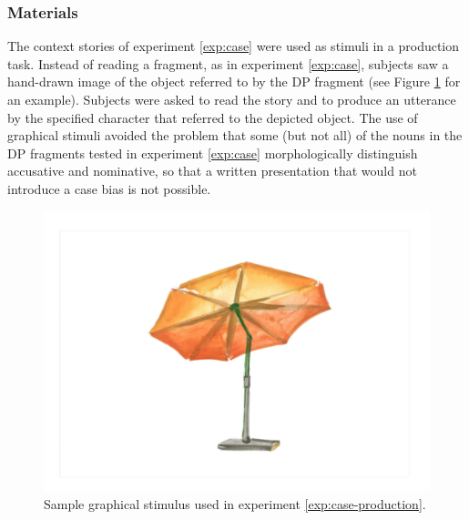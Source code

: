 \subsubsection{Materials}
The context stories of experiment \ref{exp:case} were used as stimuli in a production task. Instead of reading a fragment, as in experiment \ref{exp:case}, subjects saw a hand-drawn image of the object referred to by the DP fragment (see Figure \ref{fig:production-stim} for an example). Subjects were asked to read the story and to produce an utterance by the specified character that referred to the depicted object. The use of graphical stimuli avoided the problem that some (but not all) of the nouns in the DP fragments tested in experiment \ref{exp:case} morphologically distinguish accusative and nominative, so that a written presentation that would not introduce a case bias is not possible.

\begin{figure}[t]
 \includegraphics[scale=.3]{figures/production_sunshade.pdf}
 \caption{Sample graphical stimulus used in experiment \ref{exp:case-production}.\label{fig:production-stim}}
\end{figure}

